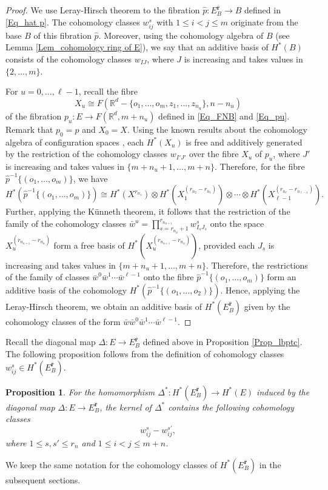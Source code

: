 \documentclass[12pt,oneside,reqno]{amsart}
\theoremstyle{plain}
\newtheorem{proposition}[theorem]{Proposition}
\theoremstyle{definition}
\theoremstyle{remark}
\newcommand{\rr}{{\mathbb {R}}}
\newcommand{\br}{\bar{\mathbf{r}}}
\begin{document}
\begin{proof}
We use Leray-Hirsch theorem to the fibration $\hat{p}\colon E^{\br}_B\to B$ defined in \eqref{Eq_hat p}.  The cohomology classes $w^s_{ij}$ with $1\leq i< j \leq m$ originate from the base $B$ of this fibration $\hat{p}$. Moreover, using the cohomology algebra of $B$ (see Lemma \ref{Lem_cohomology ring of E}), we say that an additive basis of $H^*(B)$ consists of the cohomology classes $w_{IJ}$, where $J$ is increasing and takes values in $\{2,...,m\}$. 

For $u=0,\ldots,\ell-1$, recall the fibre $$X_u\cong F(\rr^d-\{o_1,\ldots,o_m,z_1,\ldots,z_{n_u}\}, n-n_u)$$ of the fibration $p_u\colon E\to F(\rr^d,m+n_u)$ defined in \eqref{Eq_FNB}  and \eqref{Eq_pu}.
Remark that $p_0 = p$ and $X_0 = X$.
Using the known results about the cohomology algebra of configuration spaces \cite[Chapter V, Theorem 4.2 and 4.3]{FadH01}, each $H^*(X_u)$ is free and additively generated by the restriction of the cohomology classes $w_{I'J'}$ over the fibre $X_u$ of $p_u$, where $J'$ is increasing and takes values in $\{m+n_u+1,\ldots, m+n\}$. Therefore, for the fibre $\hat{p}^{-1}\{(o_1,\dots, o_m)\}$, we have $$H^*(\hat{p}^{-1}\{(o_1, \dots, o_m)\}) \cong H^*(X^{r_{n_1}}) \otimes H^*(X^{(r_{n_2} - r_{n_1})}_1) \otimes \cdots \otimes H^*(X^{(r_{n_\ell} - r_{n_{\ell - 1}})}_{\ell - 1}).$$
Further, applying the K\"unneth theorem, it follows that the restriction of the family of the cohomology classes $\bar{w}^u=\displaystyle\prod^{r_{n_{u+1}}}_{s = r_{n_{u}}+1} w^s_{I_sJ_s}$ onto the space $X^{(r_{n_{u+1}}-r_{n_u})}_u$ form a free basis of $H^*(X^{(r_{n_{u+1}}-r_{n_u})}_u)$, provided each $J_s$ is increasing and takes values in $\{m+n_u+1,\ldots,m+n\}$. Therefore, the restrictions of the family of classes  $\bar{w}^0 \bar{w}^1 \cdots \bar{w}^{\ell-1}$ onto the fibre $\hat{p}^{-1}\{(o_1,\ldots,o_m)\}$ form an additive basis of the cohomology $H^*(\hat{p}^{-1}\{(o_1, \dots, o_2)\})$. Hence, applying the Leray-Hirsch theorem, we obtain an additive basis of $H^*(E^{\br}_B)$ given by the cohomology classes of the form $\bar{w} \bar{w}^0 \bar{w}^1 \cdots \bar{w}^{\ell-1}.$
\end{proof}



Recall the diagonal map $\Delta\colon E\to E^{\br}_B$ defined above in Proposition \ref{Prop_lbptc}. The following proposition follows from the definition of cohomology classes $w^s_{ij}\in H^*(E^{\br}_B)$.

\begin{proposition}\label{Prop_kernel of diagonal map}
For the homomorphism $\Delta^*\colon H^*(E^{\br}_B)\to H^*(E)$ induced by the diagonal map $\Delta\colon E\to E^{\br}_B$, the kernel of $\Delta^*$ contains the following cohomology classes $$w^s_{ij} - w^{s'}_{ij},$$ where $1\leq s, s'\leq r_n$ and $1\leq i<j\leq m+n$.
\end{proposition}
\noindent We keep the same notation for the cohomology classes of $H^{*}(E^{\br}_B)$ in the subsequent sections.
\end{document}
